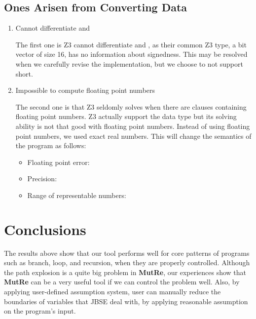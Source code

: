 \documentclass{article}
\begin{document}
\subsection{Ones Arisen from Converting Data}
\begin{enumerate}
    \item Cannot differentiate  and 
    
    The first one is Z3 cannot differentiate  and , as their common Z3 type, a bit vector of size 16, has no information about signedness. This may be resolved when we carefully revise the implementation, but we choose to not support short.
    \item Impossible to compute floating point numbers
    
    The second one is that Z3 seldomly solves when there are clauses containing floating point numbers. Z3 actually support the data type but its solving ability is not that good with floating point numbers. Instead of using floating point numbers, we used exact real numbers. This will change the semantics of the program as follows:
    \begin{itemize}
        \item Floating point error: 
        \item Precision: 
        \item Range of representable numbers:\\
    \end{itemize}
    
    
\end{enumerate}





\section{Conclusions}

\iffalse
위의 결과로 우리는 mutre가 branch, loop, recursion같은 프로그래밍의 핵심 요소들에 대해서 잘 대응한다는 것을 확인했다. 

Path explosion이라는 큰 문제점 때문에 당장은 활용하기 어려울지라도, 우리는 이번 실험을 통해 Path explosion만 어떻게 해결된다면 우리의 툴이 유용하게 사용될 것이라고 예상한다.

또한 사용자의 manual한 assumption으로 variable space를 줄여 현 상황에서도 활용할 수 있음을 보였다.


\fi
The results above show that our tool performs well for core patterns of programs such as branch, loop, and recursion, when they are properly controlled. Although the path explosion is a quite big problem in \textbf{MutRe}, our experiences show that \textbf{MutRe} can be a very useful tool if we can control the problem well. Also, by applying user-defined assumption system, user can manually reduce the boundaries of variables that JBSE deal with, by applying reasonable assumption on the program's input.



\nocite{*}
\printbibliography
\end{document}
